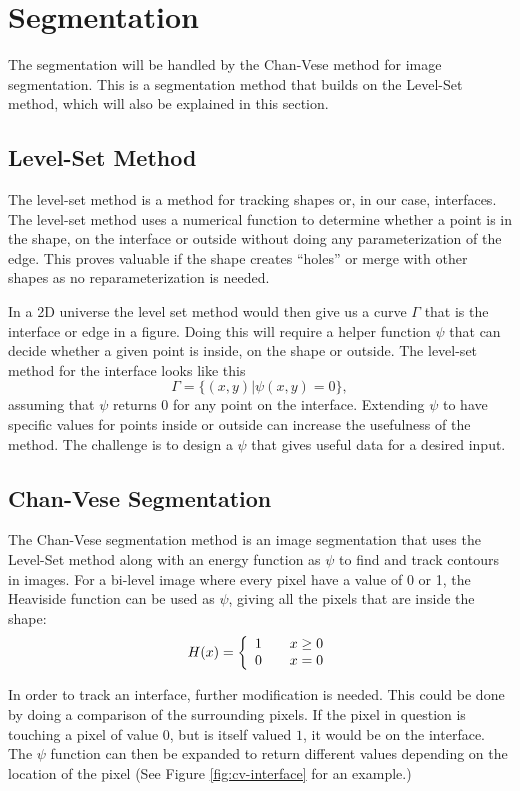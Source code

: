 \section{Segmentation}
\label{sec:chanvese}
The segmentation will be handled by the Chan-Vese method for image segmentation.
This is a segmentation method that builds on the Level-Set method, which will
also be explained in this section.

\subsection{Level-Set Method}
The level-set method is a method for tracking shapes or, in our case, interfaces.
The level-set method uses a numerical function to determine whether a point is
in the shape, on the interface or outside without doing any parameterization of
the edge. This proves valuable if the shape creates ``holes'' or merge with
other shapes as no reparameterization is needed.

In a 2D universe the level set method would then give us a curve $\Gamma$ that
is the interface or edge in a figure. Doing this will require a helper function
$\psi$ that can decide whether a given point is inside, on the shape or outside.
The level-set method for the interface looks like this
\[
  \Gamma = \{ (x,y)|\psi(x,y)=0  \},
\]
assuming that $\psi$ returns 0 for any point on the interface. Extending $\psi$
to have specific values for points inside or outside can increase the
usefulness of the method. The challenge is to design a $\psi$ that gives useful
data for a desired input.

\subsection{Chan-Vese Segmentation}
The Chan-Vese segmentation method is an image segmentation that uses the
Level-Set method along with an energy function as $\psi$ to find and track
contours in images. For a bi-level image where every pixel have a value of 0 or
1, the Heaviside function can be used as $\psi$, giving all the pixels that are
inside the shape:
\[
  H(x) = \left\{
  \begin{array}{l l}
    1 & \quad x \geq 0 \\
    0 & \quad x = 0
  \end{array}
  \right.
\]

In order to track an interface, further modification is needed. This could be
done by doing a comparison of the surrounding pixels. If the pixel in question
is touching a pixel of value $0$, but is itself valued $1$, it would be on the
interface. The $\psi$ function can then be expanded to return different values
depending on the location of the pixel (See Figure \ref{fig:cv-interface} for
an example.)

